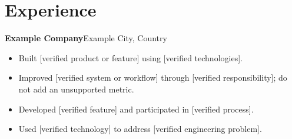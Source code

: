 \section{Experience}
\textbf{Example Company}\hfill\textcolor{muted}{Example City, Country}

\begin{itemize}
  \item Built [verified product or feature] using [verified technologies].
  \item Improved [verified system or workflow] through [verified responsibility]; do not add an unsupported metric.
\end{itemize}

\begin{itemize}
  \item Developed [verified feature] and participated in [verified process].
  \item Used [verified technology] to address [verified engineering problem].
\end{itemize}
